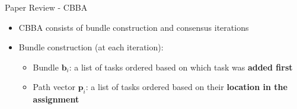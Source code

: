 \begin{frame}{Paper Review - CBBA}
    \begin{itemize}
        \item CBBA consists of bundle construction and consensus iterations
        \item Bundle construction (at each iteration):
        \begin{itemize}
            \item Bundle $\mathbf{b}_i$: a list of tasks ordered based on which task was \textbf{added first}
            \item Path vector $\mathbf{p}_i$: a list of tasks ordered based on their \textbf{location in the assignment}
        \end{itemize}
    \end{itemize}
\end{frame}


